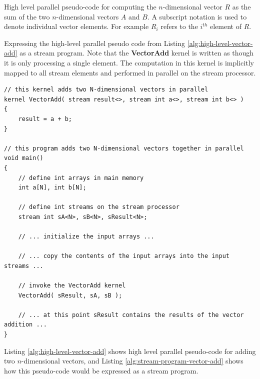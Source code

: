 \begin{Listing}[t]
    \caption{High level parallel pseudo-code for computing the $n$-dimensional vector $R$ as the sum of the two $n$-dimensional vectors $A$ and $B$. A subscript notation is used to denote individual vector elements. For example $R_{i}$ refers to the $i^{th}$ element of $R$.}
    \begin{algorithmic}[1]
        \ENDFOR
    \end{algorithmic}
    \label{alg:high-level-vector-add}
\end{Listing}
\begin{Listing}[t]
    \caption{Expressing the high-level parallel pseudo code from Listing \ref{alg:high-level-vector-add} as a stream program. Note that the \textbf{VectorAdd} kernel is written as though it is only processing a single element. The computation in this kernel is implicitly mapped to all stream elements and performed in parallel on the stream processor.}
    \scriptsize
    \begin{verbatim}
// this kernel adds two N-dimensional vectors in parallel
kernel VectorAdd( stream result<>, stream int a<>, stream int b<> )
{
    result = a + b;
}

// this program adds two N-dimensional vectors together in parallel 
void main()
{
    // define int arrays in main memory
    int a[N], int b[N];
    
    // define int streams on the stream processor
    stream int sA<N>, sB<N>, sResult<N>;
 
    // ... initialize the input arrays ...
    
    // ... copy the contents of the input arrays into the input streams ...
        
    // invoke the VectorAdd kernel
    VectorAdd( sResult, sA, sB );

    // ... at this point sResult contains the results of the vector addition ...
}
    \end{verbatim}
    \label{alg:stream-program-vector-add}
\end{Listing}
Listing \ref{alg:high-level-vector-add} shows high level parallel pseudo-code for adding two $n$-dimensional vectors, and Listing \ref{alg:stream-program-vector-add} shows how this pseudo-code would be expressed as a stream program.

